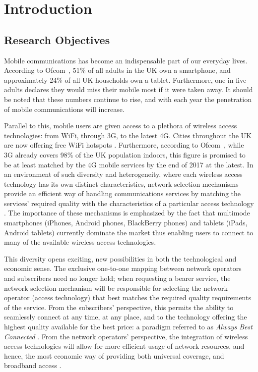 \chapter{Introduction} %
\label{cha:introduction}

\minitoc
\vspace{10mm}

\section{Research Objectives} %
\label{sec:research_objectives_introduction}
Mobile communications has become an indispensable part of our everyday lives. According to Ofcom~\cite{OfcomReport2013}, 51\% of all adults in the UK own a smartphone, and approximately 24\% of all UK households own a tablet. Furthermore, one in five adults declares they would miss their mobile most if it were taken away. It should be noted that these numbers continue to rise, and with each year the penetration of mobile communications will increase.

Parallel to this, mobile users are given access to a plethora of wireless access technologies: from WiFi, through 3G, to the latest 4G. Cities throughout the UK are now offering free WiFi hotspots \cite{BBCWiFiGlasgow2014}. Furthermore, according to Ofcom~\cite{OfcomLTE2013}, while 3G already covers 98\% of the UK population indoors, this figure is promised to be at least matched by the 4G mobile services by the end of 2017 at the latest. In an environment of such diversity and heterogeneity, where each wireless access technology has its own distinct characteristics, network selection mechanisms provide an efficient way of handling communications services by matching the services' required quality with the characteristics of a particular access technology \cite{HossainBeaubrun09}. The importance of these mechanisms is emphasized by the fact that multimode smartphones (iPhones, Android phones, BlackBerry phones) and tablets (iPads, Android tablets) currently dominate the market thus enabling users to connect to many of the available wireless access technologies.

This diversity opens exciting, new possibilities in both the technological and economic sense. The exclusive one-to-one mapping between network operators and subscribers need no longer hold; when requesting a bearer service, the network selection mechanism will be responsible for selecting the network operator (access technology) that best matches the required quality requirements of the service. From the subscribers' perspective, this permits the ability to seamlessly connect at any time, at any place, and to the technology offering the highest quality available for the best price: a paradigm referred to as \emph{Always Best Connected} \cite{ABC03}. From the network operators' perspective, the integration of wireless access technologies will allow for more efficient usage of network resources, and hence, the most economic way of providing both universal coverage, and broadband access \cite{HossainBeaubrun09}.

